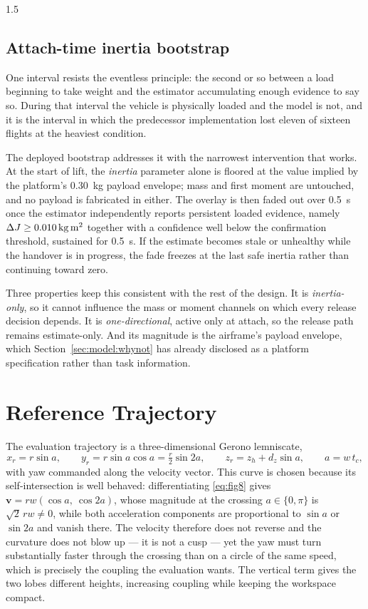 \begin{spacing}{1.5}
\subsection{Attach-time inertia bootstrap}\label{sec:frame:bootstrap}

One interval resists the eventless principle: the second or so between a load
beginning to take weight and the estimator accumulating enough evidence to say
so. During that interval the vehicle is physically loaded and the model is not,
and it is the interval in which the predecessor implementation lost eleven of
sixteen flights at the heaviest condition.

The deployed bootstrap addresses it with the narrowest intervention that works.
At the start of lift, the \emph{inertia} parameter alone is floored at the value
implied by the platform's \SI{0.30}{\kg} payload envelope; mass and first moment
are untouched, and no payload is fabricated in either. The overlay is then faded
out over \SI{0.5}{\second} once the estimator independently reports persistent
loaded evidence, namely $\dJ\ge\SI{0.010}{\kg\meter\squared}$ together with a
confidence well below the confirmation threshold, sustained for
\SI{0.5}{\second}. If the estimate becomes stale or unhealthy while the handover
is in progress, the fade freezes at the last safe inertia rather than continuing
toward zero.

Three properties keep this consistent with the rest of the design. It is
\emph{inertia-only}, so it cannot influence the mass or moment channels on which
every release decision depends. It is \emph{one-directional}, active only at
attach, so the release path remains estimate-only. And its magnitude is the
airframe's payload envelope, which Section~\ref{sec:model:whynot} has already
disclosed as a platform specification rather than task information.

\section{Reference Trajectory}\label{sec:frame:ref}

The evaluation trajectory is a three-dimensional Gerono lemniscate,
\begin{equation}
x_r = r\sin a, \qquad
y_r = r\sin a\cos a = \tfrac{r}{2}\sin 2a, \qquad
z_r = z_h + d_z\sin a, \qquad a = w\,t_c ,
\label{eq:fig8}
\end{equation}
with yaw commanded along the velocity vector. This curve is chosen because its
self-intersection is well behaved: differentiating \eqref{eq:fig8} gives
$\bm v = rw(\cos a,\ \cos 2a)$, whose magnitude at the crossing $a\in\{0,\pi\}$
is $\sqrt2\,rw\neq0$, while both acceleration components are proportional to
$\sin a$ or $\sin 2a$ and vanish there. The velocity therefore does not reverse
and the curvature does not blow up --- it is not a cusp --- yet the yaw must turn
substantially faster through the crossing than on a circle of the same speed,
which is precisely the coupling the evaluation wants. The vertical term gives the
two lobes different heights, increasing coupling while keeping the workspace
compact.


\end{spacing}
